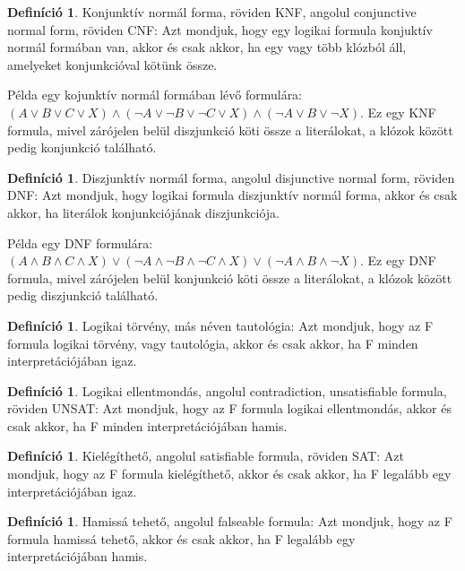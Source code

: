 \documentclass[
]{thesis-ekf}
\theoremstyle{definition}
\newtheorem{definicio}[tetel]{Definíció}
\theoremstyle{remark}
\begin{document}
\begin{definicio}\label{def-cnf}
	Konjunktív normál forma, röviden \textsc{KNF}, angolul conjunctive normal form, röviden \textsc{CNF}: Azt mondjuk, hogy egy logikai formula konjuktív normál formában van, akkor és csak akkor, ha egy vagy több klózból áll, amelyeket
	konjunkcióval kötünk össze.
\end{definicio}

Példa egy kojunktív normál formában lévő formulára: $ (A \vee B \vee C \vee X) \wedge (\neg A \vee \neg B \vee \neg C \vee X) \wedge (\neg A \vee B \vee \neg X) $. Ez egy KNF formula, mivel zárójelen belül diszjunkció köti össze a literálokat, a klózok között pedig konjunkció található.

\begin{definicio}\label{def-dnf}
	Diszjunktív normál forma, angolul disjunctive normal form, röviden \textsc{DNF}: Azt mondjuk, hogy logikai formula diszjunktív normál forma, akkor és csak akkor, ha literálok konjunkciójának diszjunkciója.
\end{definicio}


	Példa egy DNF formulára: $ (A \wedge B \wedge C \wedge X) \vee (\neg A \wedge \neg B \wedge \neg C \wedge X) \vee (\neg A \wedge B \wedge \neg X) $. Ez egy DNF formula, mivel zárójelen belül konjunkció köti össze a literálokat, a klózok között pedig diszjunkció található.


\begin{definicio}\label{def-tautologia}
	Logikai törvény, más néven tautológia: Azt mondjuk, hogy az F formula logikai törvény, vagy tautológia, akkor és csak akkor, ha F minden interpretációjában igaz.
\end{definicio}

\begin{definicio}
	Logikai ellentmondás, angolul contradiction, unsatisfiable formula, röviden UNSAT: Azt mondjuk, hogy az F formula logikai ellentmondás, akkor és csak akkor, ha F minden interpretációjában hamis.
\end{definicio}

\begin{definicio}
	Kielégíthető, angolul satisfiable formula, röviden \textsc{SAT}: Azt mondjuk, hogy az F formula kielégíthető, akkor és csak akkor, ha F legalább egy interpretációjában igaz.
\end{definicio}

\begin{definicio}
	Hamissá tehető, angolul falseable formula: Azt mondjuk, hogy az F formula hamissá tehető, akkor és csak akkor, ha F legalább egy interpretációjában hamis. 
\end{definicio}
\end{document}
